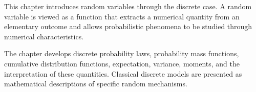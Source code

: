 This chapter introduces random variables through the discrete case. A random variable is viewed as a function that extracts a numerical quantity from an elementary outcome and allows probabilistic phenomena to be studied through numerical characteristics.

The chapter develops discrete probability laws, probability mass functions, cumulative distribution functions, expectation, variance, moments, and the interpretation of these quantities. Classical discrete models are presented as mathematical descriptions of specific random mechanisms.









